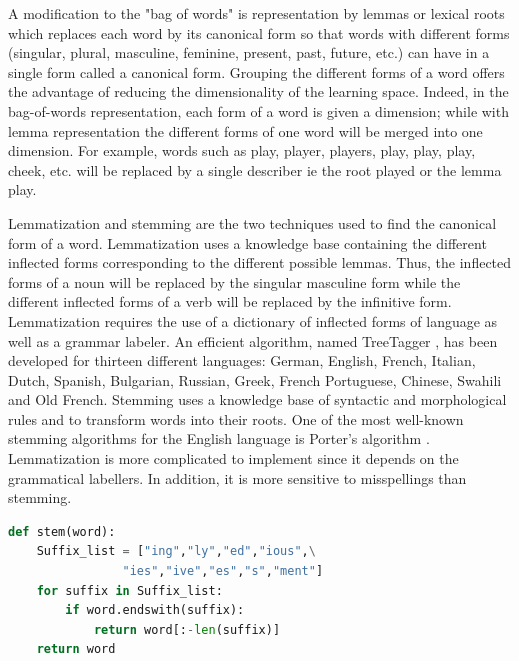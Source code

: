 
A modification to the "bag of words" is representation by lemmas or lexical roots which replaces  each word by its canonical form so that words with different
forms (singular, plural, masculine, feminine, present, past,
future, etc.) can have in a single form called a canonical form.
Grouping the different forms of a word offers the advantage of  reducing the dimensionality of the learning space. Indeed, in the bag-of-words representation, each form of a word is given a dimension; while with lemma representation the different forms of one word will be merged into one dimension. For example, words such as play, player, players, play, play, play, cheek, etc. will be replaced by a single describer ie the root played or the lemma play.


Lemmatization and stemming are the two techniques used to find the canonical form of a word. Lemmatization uses a knowledge base containing the different inflected forms corresponding to the different possible lemmas. Thus, the inflected forms of a noun will be replaced by the singular masculine form while the different inflected forms of a verb will be replaced by the infinitive form. Lemmatization requires the use of a dictionary of inflected forms of language as well as a grammar labeler. An efficient algorithm, named TreeTagger \citep{schmid1994probabilistic}, has been developed for thirteen different languages: German, English, French, Italian, Dutch, Spanish, Bulgarian, Russian, Greek, French Portuguese, Chinese, Swahili and Old French. Stemming uses a knowledge base of syntactic and morphological rules and to transform words into their roots. One of the most well-known stemming algorithms for the English language is Porter's algorithm \citep{porter1980algorithm}. Lemmatization is more complicated to implement since it depends on the grammatical labellers. In addition, it is more sensitive to misspellings than stemming.

\begin{lstlisting}[language=Python, caption=Python example]
def stem(word):
    Suffix_list = ["ing","ly","ed","ious",\
				"ies","ive","es","s","ment"]
    for suffix in Suffix_list:
        if word.endswith(suffix):
            return word[:-len(suffix)]
    return word
\end{lstlisting}

